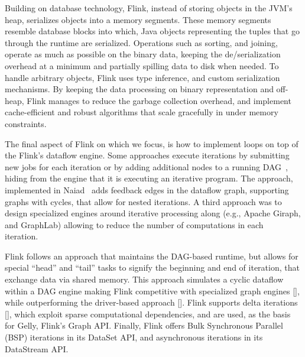  Building on database technology, Flink, instead of storing objects in the JVM's heap, serializes objects into a  memory segments. These memory segments resemble database blocks into which, Java objects representing the tuples that go through the runtime are serialized. Operations such as sorting, and joining, operate as much as possible on the binary data, keeping the de/serialization overhead at a minimum and partially spilling data to disk when needed. To handle arbitrary objects, Flink uses type inference, and  custom serialization mechanisms.  By keeping the data processing on binary representation and off-heap, Flink manages to reduce the garbage collection overhead, and implement cache-efficient and robust algorithms that scale gracefully in under memory constraints.

 The final aspect of Flink on which we focus, is how to implement loops on top of the Flink's dataflow engine. Some approaches execute iterations by submitting new jobs for each iteration or by adding additional nodes to a running DAG~\cite{DBLP:journals/pvldb/BuHBE10, DBLP:conf/hotcloud/ZahariaCFSS10}, hiding from  the engine that it is executing an iterative program. The approach, implemented in Naiad~\cite{murray2013naiad} adds feedback edges in the dataflow graph, supporting graphs with cycles, that  allow for nested iterations. A third approach was to design specialized engines around iterative processing along (e.g., Apache Giraph, and GraphLab) allowing to reduce the number of computations in each iteration.~\cite{low2012distributed}

Flink follows an approach that maintains the DAG-based runtime, but allows for special ``head'' and ``tail'' tasks to signify the beginning and end of iteration, that exchange data via shared memory. This approach simulates a cyclic dataflow within a DAG engine making Flink competitive with specialized graph engines [], while outperforming the driver-based approach []. Flink supports delta iterations [], which exploit sparse computational dependencies, and are used, as the basis for Gelly, Flink's Graph API. Finally, Flink offers Bulk Synchronous Parallel (BSP) iterations in its DataSet API, and asynchronous iterations in its DataStream API.
